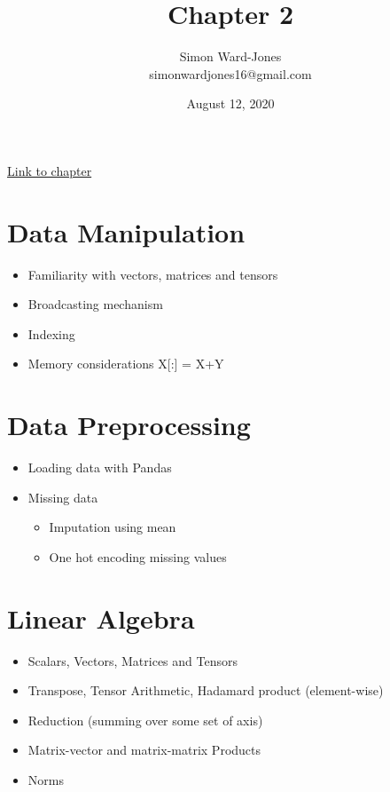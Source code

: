 \documentclass[12pt,notitlepage]{article}
\begin{document}


\title{\Large{\textbf{Chapter 2}}}
\date{August 12, 2020}
\author{Simon Ward-Jones\\simonwardjones16@gmail.com}

\maketitle
\href{https://d2l.ai/chapter_preliminaries/index.html}{Link to chapter}

\section{Data Manipulation}
\begin{itemize}
    \item Familiarity with vectors, matrices and tensors
    \item Broadcasting mechanism
    \item Indexing
    \item Memory considerations X[:] = X+Y 
\end{itemize}

\section{Data Preprocessing}
\begin{itemize}
    \item Loading data with Pandas
    \item Missing data
    \begin{itemize}
        \item Imputation using mean
        \item One hot encoding missing values
    \end{itemize}
\end{itemize}

\section{Linear Algebra}
\begin{itemize}
    \item Scalars, Vectors, Matrices and Tensors
    \item Transpose, Tensor Arithmetic, Hadamard product (element-wise)
    \item Reduction (summing over some set of axis)
    \item Matrix-vector and matrix-matrix Products
    \item Norms
\end{itemize}
\end{document}
